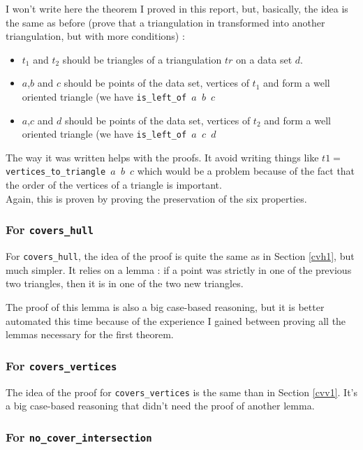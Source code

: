 \documentclass[a4paper,10pt]{article}
\begin{document}
I won't write here the theorem I proved in this report, but, basically, the idea is the same as before (prove that a triangulation in transformed into another triangulation, but with more conditions) :
\begin{itemize}
\item $t_1$ and $t_2$ should be triangles of a triangulation $tr$ on a data set $d$.  
\item $a$,$b$ and $c$ should be points of the data set, vertices of $t_1$ and form a well oriented triangle (we have {\tt is\_left\_of $a$ $b$ $c$}
\item $a$,$c$ and $d$ should be points of the data set, vertices of $t_2$ and form a well oriented triangle (we have {\tt is\_left\_of $a$ $c$ $d$}
\end{itemize}
The way it was written helps with the proofs. It avoid writing things like $t1 = ${\tt vertices\_to\_triangle $a$ $b$ $c$} which would be a problem because of the fact that the order of the vertices of a triangle is important.\\
Again, this is proven by proving the preservation of the six properties.

\subsubsection{For {\tt covers\_hull}} 

For {\tt covers\_hull}, the idea of the proof is quite the same as in Section \ref{cvh1}, but much simpler.
It relies on a lemma : if a point was strictly in one of the previous two triangles, then it is in one of the two new triangles.

The proof of this lemma is also a big case-based reasoning, but it is better automated this time because of the experience I gained between proving all the lemmas necessary for the first theorem.

\subsubsection{For {\tt covers\_vertices}}

The idea of the proof for {\tt covers\_vertices} is the same than in Section \ref{cvv1}. It's a big case-based reasoning that didn't need the proof of another lemma.

\subsubsection{For {\tt no\_cover\_intersection}}
\end{document}
